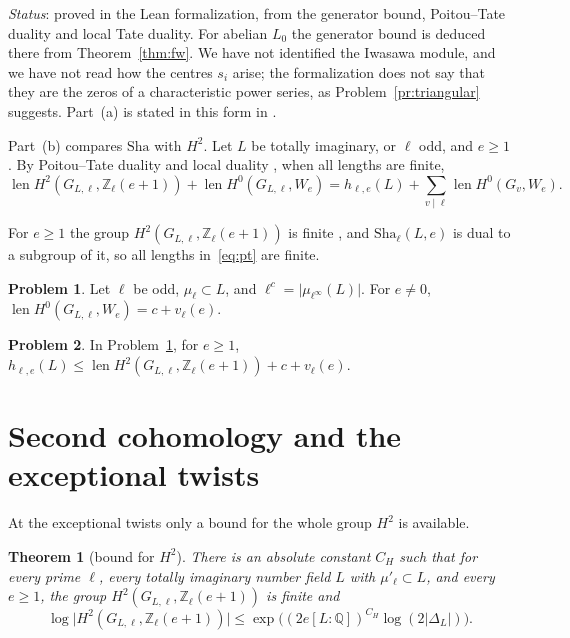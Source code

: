 \documentclass[reqno]{amsart}
\theoremstyle{definition}
\newtheorem{problem}{Problem}[section]
\theoremstyle{plain}
\newtheorem{theorem}{Theorem}[section]
\theoremstyle{remark}
\newcommand{\Z}{\mathbb{Z}}
\newcommand{\Q}{\mathbb{Q}}
\newcommand{\Zl}{\Z_\ell}
\newcommand{\len}{\operatorname{len}}
\newcommand{\Sha}{\mathrm{Sha}}
\begin{document}
\noindent\emph{Status}: proved in the Lean formalization, from the generator bound, Poitou--Tate duality and local Tate duality.  For abelian \(L_0\) the generator bound is deduced there from Theorem~\ref{thm:fw}.  We have not identified the Iwasawa module, and we have not read how the centres \(s_i\) arise; the formalization does not say that they are the zeros of a characteristic power series, as Problem~\ref{pr:triangular} suggests.  Part~(a) is stated in this form in \cite[\S5.5]{Zh}.

Part~(b) compares \(\Sha\) with \(H^2\).  Let \(L\) be totally imaginary, or \(\ell\) odd, and \(e\ge1\).  By Poitou--Tate duality and local duality \cite[Ch.~VII, \S2; Ch.~VIII, \S6]{NSW}, when all lengths are finite,
\begin{equation}\label{eq:pt}
 \len H^2(G_{L,\ell},\Zl(e+1))+\len H^0(G_{L,\ell},W_e)=h_{\ell,e}(L)+\sum_{v\mid\ell}\len H^0(G_v,W_e).
\end{equation}

For \(e\ge1\) the group \(H^2(G_{L,\ell},\Zl(e+1))\) is finite \cite{So79}, and \(\Sha_\ell(L,e)\) is dual to a subgroup of it, so all lengths in~\eqref{eq:pt} are finite.

\begin{problem}\label{pr:H0-layer}
Let \(\ell\) be odd, \(\mu_\ell\subset L\), and \(\ell^c=\lvert\mu_{\ell^\infty}(L)\rvert\).  For \(e\ne0\), \(\len H^0(G_{L,\ell},W_e)=c+v_\ell(e)\).
\end{problem}

\begin{problem}\label{pr:sha-H2}
In Problem~\ref{pr:H0-layer}, for \(e\ge1\), \(h_{\ell,e}(L)\le\len H^2(G_{L,\ell},\Zl(e+1))+c+v_\ell(e)\).
\end{problem}

\section{Second cohomology and the exceptional twists}\label{sec:H2}

At the exceptional twists only a bound for the whole group \(H^2\) is available.

\begin{theorem}[bound for \(H^2\)]\label{thm:H2}
There is an absolute constant \(C_H\) such that for every prime \(\ell\), every totally imaginary number field \(L\) with \(\mu'_\ell\subset L\), and every \(e\ge1\), the group \(H^2(G_{L,\ell},\Zl(e+1))\) is finite and
\[
 \log\bigl\lvert H^2(G_{L,\ell},\Zl(e+1))\bigr\rvert\le\exp\bigl((2e[L:\Q])^{C_H}\log(2\lvert\Delta_L\rvert)\bigr).
\]
\end{theorem}
\end{document}
